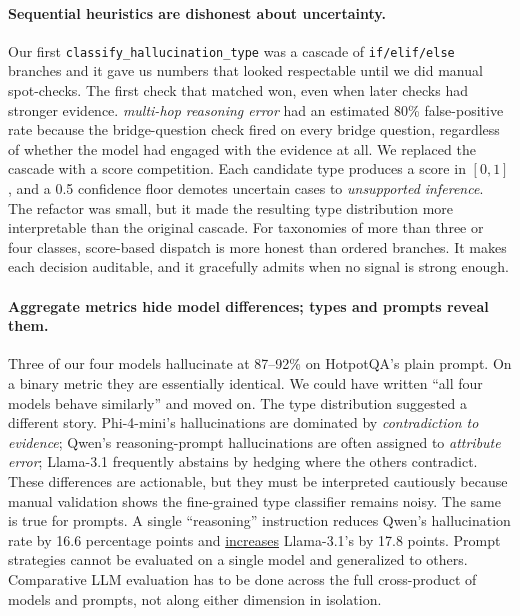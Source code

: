 \documentclass[11pt,a4paper]{article}
\renewcommand{\emph}[1]{\uline{#1}}
\newcommand{\lbl}[1]{\textit{#1}}
\begin{document}
\paragraph{Sequential heuristics are dishonest about uncertainty.} Our first \texttt{classify\_hallucination\_type} was a cascade of \texttt{if/elif/else} branches and it gave us numbers that looked respectable until we did manual spot-checks. The first check that matched won, even when later checks had stronger evidence. \lbl{multi-hop reasoning error} had an estimated 80\% false-positive rate because the bridge-question check fired on every bridge question, regardless of whether the model had engaged with the evidence at all. We replaced the cascade with a score competition. Each candidate type produces a score in $[0, 1]$, and a 0.5 confidence floor demotes uncertain cases to \lbl{unsupported inference}. The refactor was small, but it made the resulting type distribution more interpretable than the original cascade. For taxonomies of more than three or four classes, score-based dispatch is more honest than ordered branches. It makes each decision auditable, and it gracefully admits when no signal is strong enough.

\paragraph{Aggregate metrics hide model differences; types and prompts reveal them.} Three of our four models hallucinate at 87--92\% on HotpotQA's plain prompt. On a binary metric they are essentially identical. We could have written ``all four models behave similarly'' and moved on. The type distribution suggested a different story. Phi-4-mini's hallucinations are dominated by \lbl{contradiction to evidence}; Qwen's reasoning-prompt hallucinations are often assigned to \lbl{attribute error}; Llama-3.1 frequently abstains by hedging where the others contradict. These differences are actionable, but they must be interpreted cautiously because manual validation shows the fine-grained type classifier remains noisy. The same is true for prompts. A single ``reasoning'' instruction reduces Qwen's hallucination rate by 16.6 percentage points and \emph{increases} Llama-3.1's by 17.8 points. Prompt strategies cannot be evaluated on a single model and generalized to others. Comparative LLM evaluation has to be done across the full cross-product of models and prompts, not along either dimension in isolation.
\end{document}
